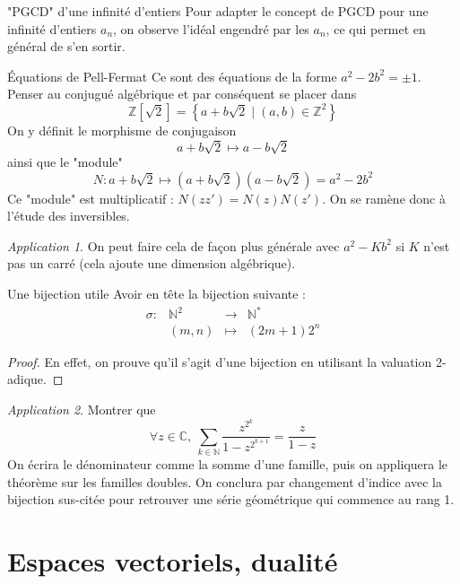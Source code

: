 \documentclass[french]{book}
\newcommand{\N}{\mathbb{N}}
\newcommand{\Z}{\mathbb{Z}}
\newcommand{\C}{\mathbb{C}}
\newcommand{\st}{^*}
\theoremstyle{plain}
\theoremstyle{definition}
\theoremstyle{remark}
\newtheorem*{app}{Application}
\begin{document}
\begin{AS}{"PGCD" d'une infinité d'entiers} Pour adapter le concept de PGCD pour une infinité d'entiers $a_n$, on observe l'idéal engendré par les $a_n$, ce qui permet en général de s'en sortir.
\end{AS}
\begin{AS}{Équations de Pell-Fermat} Ce sont des équations de la forme $a^2-2b^2=\pm1$. Penser au conjugué algébrique et par conséquent se placer dans $$\Z[\sqrt{2}]=\left\{a+b\sqrt{2}\mid (a,b)\in\Z^2\right\}$$ On y définit le morphisme de conjugaison $$a+b\sqrt{2}\mapsto a-b\sqrt{2}$$ ainsi que le "module"  $$N:a+b\sqrt{2}\mapsto (a+b\sqrt{2})(a-b\sqrt{2})=a^2-2b^2$$ Ce "module" est multiplicatif : $N(zz')=N(z)N(z')$.  On se ramène donc à l'étude des inversibles.
\end{AS}
\begin{app}
	On peut faire cela de façon plus générale avec $a^2-Kb^2$ si $K$ n'est pas un carré (cela ajoute une dimension algébrique).
\end{app}
\begin{AS}{Une bijection utile} Avoir en tête la bijection suivante : $$\begin{array}{lrcl}
	\sigma :&\N^2&\longrightarrow&\N\st \\
	&(m,n)&\longmapsto&(2m+1)2^n
\end{array}$$
\end{AS} \begin{proof}
En effet, on prouve qu'il s'agit d'une bijection en utilisant la valuation 2-adique.
\end{proof}
\begin{app}
	Montrer que $$\forall z\in\C,\ \sum_{k\in\N}\frac{z^{2^k}}{1-z^{2^{k+1}}}=\frac{z}{1-z}$$ On écrira le dénominateur comme la somme d'une famille, puis on appliquera le théorème sur les familles doubles. On conclura par changement d'indice avec la bijection sus-citée pour retrouver une série géométrique qui commence au rang 1.
\end{app}

\chapter{Espaces vectoriels, dualité}
\localtableofcontents
\end{document}
